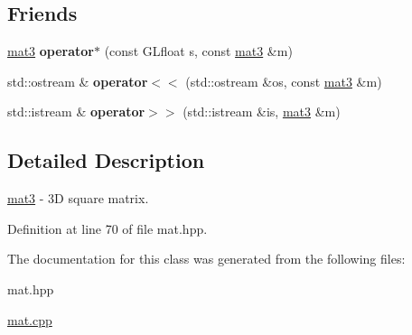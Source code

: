 \subsection*{Friends}
\begin{DoxyCompactItemize}
\item 
\hypertarget{class_angel_1_1mat3_ad9345c93609b63264fb4a4d48cef9e47}{\hyperlink{class_angel_1_1mat3}{mat3} {\bfseries operator$\ast$} (const G\-Lfloat s, const \hyperlink{class_angel_1_1mat3}{mat3} \&m)}\label{class_angel_1_1mat3_ad9345c93609b63264fb4a4d48cef9e47}

\item 
\hypertarget{class_angel_1_1mat3_a85d71885cc6797f2553701eb01c52851}{std\-::ostream \& {\bfseries operator$<$$<$} (std\-::ostream \&os, const \hyperlink{class_angel_1_1mat3}{mat3} \&m)}\label{class_angel_1_1mat3_a85d71885cc6797f2553701eb01c52851}

\item 
\hypertarget{class_angel_1_1mat3_aa6ac075e9f3776b3d6eba3e8207ab990}{std\-::istream \& {\bfseries operator$>$$>$} (std\-::istream \&is, \hyperlink{class_angel_1_1mat3}{mat3} \&m)}\label{class_angel_1_1mat3_aa6ac075e9f3776b3d6eba3e8207ab990}

\end{DoxyCompactItemize}


\subsection{Detailed Description}
\hyperlink{class_angel_1_1mat3}{mat3} -\/ 3\-D square matrix. 

Definition at line 70 of file mat.\-hpp.



The documentation for this class was generated from the following files\-:\begin{DoxyCompactItemize}
\item 
mat.\-hpp\item 
\hyperlink{mat_8cpp}{mat.\-cpp}\end{DoxyCompactItemize}
